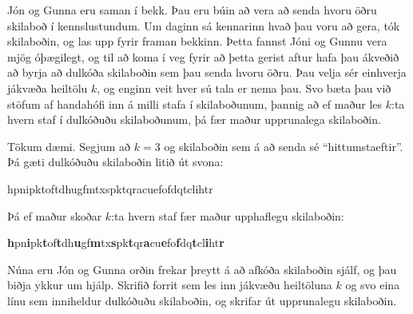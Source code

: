 
Jón og Gunna eru saman í bekk. Þau eru búin að vera að senda hvoru öðru
skilaboð í kennslustundum. Um daginn sá kennarinn hvað þau voru að gera, tók
skilaboðin, og las upp fyrir framan bekkinn. Þetta fannst Jóni og Gunnu vera
mjög óþægilegt, og til að koma í veg fyrir að þetta gerist aftur hafa þau
ákveðið að byrja að dulkóða skilaboðin sem þau senda hvoru öðru. Þau velja sér
einhverja jákvæða heiltölu $k$, og enginn veit hver sú tala er nema þau. Svo
bæta þau við stöfum af handahófi inn á milli stafa í skilaboðunum, þannig að ef
maður les $k$:ta hvern staf í dulkóðuðu skilaboðunum, þá fær maður upprunalega
skilaboðin.

Tökum dæmi. Segjum að $k=3$ og skilaboðin sem á að senda sé ``hittumstaeftir''. Þá gæti dulkóðuðu skilaboðin litið út svona:
\begin{center}
hpnipktoftdhugfmtxspktqracuefofdqtclihtr
\end{center}
Þá ef maður skoðar $k$:ta hvern staf fær maður upphaflegu skilaboðin:
\begin{center}
\textbf{h}pn\textbf{i}pk\textbf{t}of\textbf{t}dh\textbf{u}gf\textbf{m}tx\textbf{s}pk\textbf{t}qr\textbf{a}cu\textbf{e}fo\textbf{f}dq\textbf{t}cl\textbf{i}ht\textbf{r}
\end{center}

Núna eru Jón og Gunna orðin frekar þreytt á að afkóða skilaboðin sjálf, og þau
biðja ykkur um hjálp. Skrifið forrit sem les inn jákvæðu heiltöluna $k$ og svo
eina línu sem inniheldur dulkóðuðu skilaboðin, og skrifar út upprunalegu
skilaboðin.

